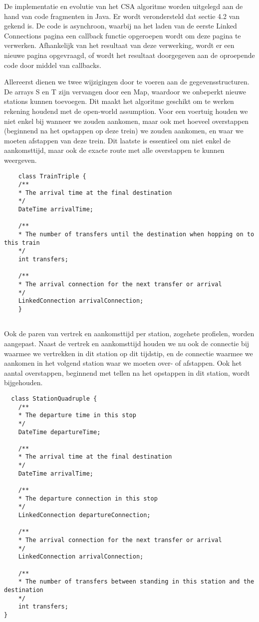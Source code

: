 De implementatie en evolutie van het CSA algoritme worden uitgelegd aan de hand van code fragmenten in Java. Er wordt verondersteld dat sectie 4.2 van \cite{strasser17} gekend is. De code is asynchroon, waarbij na het laden van de eerste Linked Connections pagina een callback functie opgeroepen wordt om deze pagina te verwerken. Afhankelijk van het resultaat van deze verwerking, wordt er een nieuwe pagina opgevraagd, of wordt het resultaat doorgegeven aan de oproepende code door middel van callbacks.

Allereerst dienen we twee wijzigingen door te voeren aan de gegevensstructuren. De arrays S en T zijn vervangen door een Map, waardoor we onbeperkt nieuwe stations kunnen toevoegen. Dit maakt het algoritme geschikt om te werken rekening houdend met de open-world assumption. Voor een voertuig houden we niet enkel bij wanneer we zouden aankomen, maar ook met hoeveel overstappen (beginnend na het opstappen op deze trein) we zouden aankomen, en waar we moeten afstappen van deze trein. Dit laatste is essentieel om niet enkel de aankomsttijd, maar ook de exacte route met alle overstappen te kunnen weergeven. 

\begin{code}
	\begin{verbatim}
	class TrainTriple {
	/**
	* The arrival time at the final destination
	*/
	DateTime arrivalTime;
	
	/**
	* The number of transfers until the destination when hopping on to this train
	*/
	int transfers;
	
	/**
	* The arrival connection for the next transfer or arrival
	*/
	LinkedConnection arrivalConnection;
	}
	
	\end{verbatim}
\end{code}

Ook de paren van vertrek en aankomsttijd per station, zogehete profielen, worden aangepast. Naast de vertrek en aankomsttijd houden we nu ook de connectie bij waarmee we vertrekken in dit station op dit tijdstip, en de connectie waarmee we aankomen in het volgend station waar we moeten over- of afstappen. Ook het aantal overstappen, beginnend met tellen na het opstappen in dit station, wordt bijgehouden.

\begin{code}
\begin{verbatim}
  class StationQuadruple {
	/**
	* The departure time in this stop
	*/
	DateTime departureTime;
	
	/**
	* The arrival time at the final destination
	*/
	DateTime arrivalTime;
	
	/**
	* The departure connection in this stop
	*/
	LinkedConnection departureConnection;
	
	/**
	* The arrival connection for the next transfer or arrival
	*/
	LinkedConnection arrivalConnection;
	
	/**
	* The number of transfers between standing in this station and the destination
	*/
	int transfers;
}
	\end{verbatim}
\end{code}

